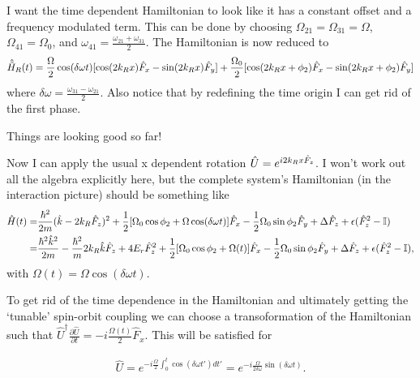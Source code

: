 I want the time dependent Hamiltonian to look like it has a constant offset and a frequency modulated term. This can be done by choosing $\Omega_{21} =\Omega_{31} = \Omega $, $\Omega_{41}=\Omega_0$, and $\omega_{41} =\frac{\omega_{21}+\omega_{31}}{2}$. The Hamiltonian is now reduced to 
%
%
\begin{align}
\begin{split}
\hat{\tilde{H}}_R(t) = \frac{\Omega}{2}\cos(\delta\omega t)[\cos(2{{k_R}} x)\hat{F}_x - \sin(2{{k_R}} x)\hat{F}_y] + \frac{\Omega_{0}}{2}[\cos(2{{k_R}} x + \phi_2)\hat{F}_x - \sin(2{{k_R}} x + \phi_2)\hat{F}_y] \\
\end{split}
\end{align}
%
%
where $\delta\omega=\frac{\omega_{31}-\omega_{21}}{2}$. Also notice that by redefining the time origin I can get rid of the first phase. 

Things are looking good so far!

Now I can apply the usual x dependent rotation $\hat{U} = e^{i2{{k_R}} x \hat{F}_z}$. I won't work out all the algebra explicitly here, but the complete system's Hamiltonian (in the interaction picture) should be something like
%
%
\begin{align}
\begin{split}
\hat{H}(t) = & \frac{\hbar^2}{2m}(\hat{k}-2{{k_R}}\hat{F}_z)^2 + \frac{1}{2}[\Omega_0\cos\phi_2 + \Omega\cos(\delta\omega t)]\hat{F}_x - \frac{1}{2}\Omega_0\sin\phi_2\hat{F}_y +\Delta\hat{F}_z + \epsilon(\hat{F}_z^2-\mathbb{I}) \\
= &\frac{\hbar^2\hat{k}^2}{2m} - \frac{\hbar^2}{m}2{{k_R}} \hat{k}\hat{F}_z +4E_r\hat{F}_z^2 + \frac{1}{2}[\Omega_0\cos\phi_2 + \Omega(t)]\hat{F}_x - \frac{1}{2}\Omega_0\sin\phi_2\hat{F}_y + \Delta\hat{F}_z +
\epsilon(\hat{F}_z^2-\mathbb{I}) ,
\end{split}
\end{align}
%
%
with $\Omega(t)=\Omega\cos(\delta\omega t)$.

To get rid of the time dependence in the Hamiltonian and ultimately getting the `tunable' spin-orbit coupling we can choose a transoformation of the Hamiltonian such that $\hat{U}^{\dagger} \frac{\partial\hat{U}}{\partial t} = -i \frac{\Omega(t)}{2}\hat{F}_x$. This will be satisfied for

\begin{align}
\hat{U} = e^{-i\frac{\Omega}{2}\int_0^t\cos(\delta\omega t')dt'} = e^{-i\frac{\Omega}{2\delta\omega}\sin(\delta\omega t)}.
\end{align}
 
